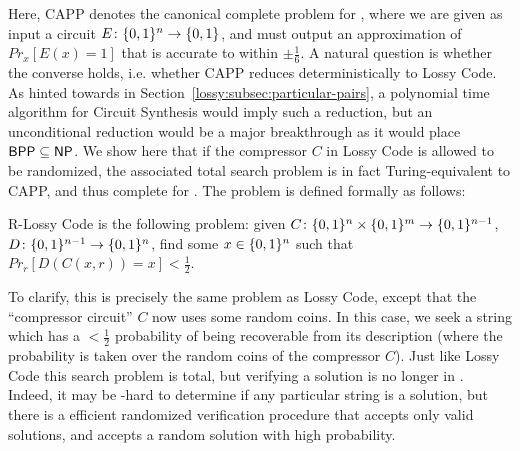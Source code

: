 Here, {\sc CAPP} denotes the canonical complete problem for , where we are given as input a circuit $E\colon \{0,1\}^n \to \{0,1\}$, and must output an approximation of $Pr_x[E(x)=1]$ that is accurate to within $\pm \frac{1}{6}$.
A natural question is whether the converse holds, i.e. whether {\sc CAPP} reduces deterministically to {\sc Lossy Code}. As hinted towards in Section~\ref{lossy:subsec:particular-pairs}, a polynomial time algorithm for {\sc Circuit Synthesis} would imply such a reduction, but an unconditional reduction would be a major breakthrough as it would place $\cl{BPP} \subseteq \cl{NP}$. We show here that if the compressor $C$ in {\sc Lossy Code} is allowed to be randomized, the associated total search problem is in fact Turing-equivalent to {\sc CAPP}, and thus complete for . The problem is defined formally as follows:

\begin{definition}
{\sc R-Lossy Code} is the following problem: given $C\colon \{0,1\}^n \times \{0,1\}^m \rightarrow \{0,1\}^{n-1}$, $D\colon \{0,1\}^{n-1} \rightarrow \{0,1\}^n$, find some $x \in \{0,1\}^n$ such that $Pr_r[D(C(x,r)) = x] < \frac{1}{2}$.
\end{definition}
To clarify, this is precisely the same problem as {\sc Lossy Code}, except that the ``compressor circuit'' $C$ now uses some random coins. In this case, we seek a string which has a $<\frac{1}{2}$ probability of being recoverable from its description (where the probability is taken over the random coins of the compressor $C$). Just like {\sc Lossy Code} this search problem is total, but verifying a solution is no longer in . Indeed, it may be -hard to determine if any particular string is a solution, but there is a efficient randomized verification procedure that accepts only valid solutions, and accepts a random solution with high probability.

